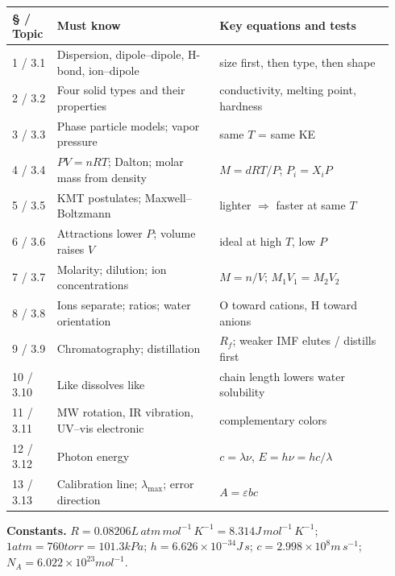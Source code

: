 \documentclass[11pt]{article}
\begin{document}
\begin{longtable}{@{}p{0.11\linewidth}p{0.40\linewidth}p{0.43\linewidth}@{}}\toprule
\S{} / Topic & Must know & Key equations and tests \\ \midrule
1 / 3.1 & Dispersion, dipole--dipole, H-bond, ion--dipole & size first, then type, then shape \\[3pt]
2 / 3.2 & Four solid types and their properties & conductivity, melting point, hardness \\[3pt]
3 / 3.3 & Phase particle models; vapor pressure & same $T$ = same KE \\[3pt]
4 / 3.4 & $PV = nRT$; Dalton; molar mass from density & $M = dRT/P$; $P_i = X_iP$ \\[3pt]
5 / 3.5 & KMT postulates; Maxwell--Boltzmann & lighter $\Rightarrow$ faster at same $T$ \\[3pt]
6 / 3.6 & Attractions lower $P$; volume raises $V$ & ideal at high $T$, low $P$ \\[3pt]
7 / 3.7 & Molarity; dilution; ion concentrations & $M = n/V$; $M_1V_1 = M_2V_2$ \\[3pt]
8 / 3.8 & Ions separate; ratios; water orientation & O toward cations, H toward anions \\[3pt]
9 / 3.9 & Chromatography; distillation & $R_f$; weaker IMF elutes / distills first \\[3pt]
10 / 3.10 & Like dissolves like & chain length lowers water solubility \\[3pt]
11 / 3.11 & MW rotation, IR vibration, UV--vis electronic & complementary colors \\[3pt]
12 / 3.12 & Photon energy & $c = \lambda\nu$, $E = h\nu = hc/\lambda$ \\[3pt]
13 / 3.13 & Calibration line; $\lambda_{\max}$; error direction & $A = \varepsilon bc$ \\ \bottomrule
\end{longtable}

\textbf{Constants.} $R = 0.08206\unit{L\,atm\,mol^{-1}\,K^{-1}} = 8.314\unit{J\,mol^{-1}\,K^{-1}}$; $1\unit{atm} = 760\unit{torr} = 101.3\unit{kPa}$; $h = 6.626\times10^{-34}\unit{J\,s}$; $c = 2.998\times10^8\unit{m\,s^{-1}}$; $N_A = 6.022\times10^{23}\unit{mol^{-1}}$.
\end{document}
